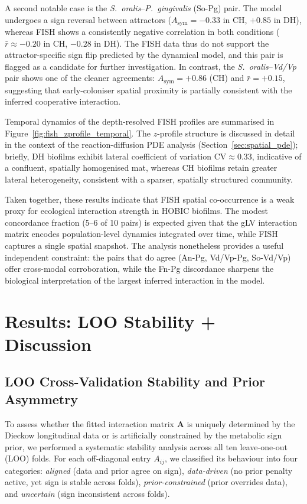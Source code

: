 A second notable case is the \textit{S.~oralis}--\textit{P.~gingivalis}
(So-Pg) pair.  The model undergoes a sign reversal between attractors
($A_\mathrm{sym} = -0.33$ in CH, $+0.85$ in DH), whereas FISH shows
a consistently negative correlation in both conditions
($\bar{r} \approx -0.20$ in CH, $-0.28$ in DH).  The FISH data thus do not
support the attractor-specific sign flip predicted by the dynamical model,
and this pair is flagged as a candidate for further investigation.
In contrast, the \textit{S.~oralis}--\textit{Vd/Vp} pair shows one of
the cleaner agreements: $A_\mathrm{sym} = +0.86$ (CH) and
$\bar{r} = +0.15$, suggesting that early-coloniser spatial proximity
is partially consistent with the inferred cooperative interaction.

Temporal dynamics of the depth-resolved FISH profiles are summarised in
Figure~\ref{fig:fish_zprofile_temporal}.
The $z$-profile structure is discussed in detail in the context of the
reaction-diffusion PDE analysis (Section~\ref{sec:spatial_pde});
briefly, DH biofilms exhibit lateral coefficient of variation
$\mathrm{CV} \approx 0.33$, indicative of a confluent, spatially
homogenised mat, whereas CH biofilms retain greater lateral heterogeneity,
consistent with a sparser, spatially structured community.

Taken together, these results indicate that FISH spatial co-occurrence
is a weak proxy for ecological interaction strength in HOBIC biofilms.
The modest concordance fraction (5--6 of 10 pairs) is expected given
that the gLV interaction matrix encodes population-level dynamics
integrated over time, while FISH captures a single spatial snapshot.
The analysis nonetheless provides a useful independent constraint: the
pairs that do agree (An-Pg, Vd/Vp-Pg, So-Vd/Vp) offer cross-modal
corroboration, while the Fn-Pg discordance sharpens the biological
interpretation of the largest inferred interaction in the model.

\section*{Results: LOO Stability + Discussion}
\subsection{LOO Cross-Validation Stability and Prior Asymmetry}

To assess whether the fitted interaction matrix $\mathbf{A}$ is uniquely determined by the Dieckow longitudinal data or is artificially constrained by the metabolic sign prior, we performed a systematic stability analysis across all ten leave-one-out (LOO) folds. For each off-diagonal entry $A_{ij}$, we classified its behaviour into four categories: \emph{aligned} (data and prior agree on sign), \emph{data-driven} (no prior penalty active, yet sign is stable across folds), \emph{prior-constrained} (prior overrides data), and \emph{uncertain} (sign inconsistent across folds).

